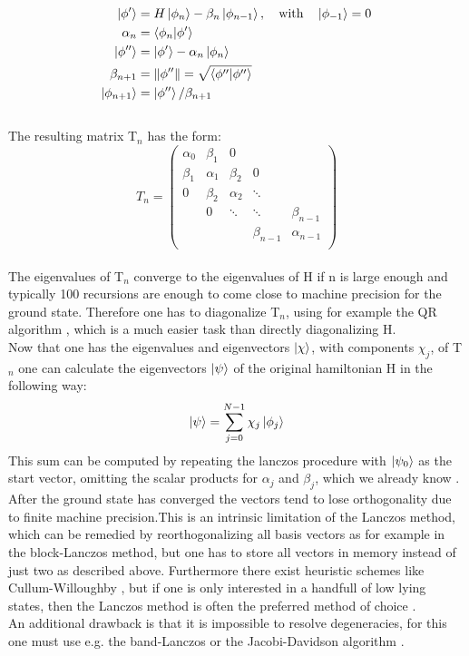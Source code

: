 \documentclass{article}
\begin{document}
\begin{align*}
\ket{\phi'}&=H\ket{\phi_n} - \beta_n\ket{\phi_{n-1}}, \quad \text{with} \quad \ket{\phi_{-1}} = 0\\
\alpha_n &= \braket{\phi_n|\phi'}\\
\ket{\phi''} &= \ket{\phi'} - \alpha_n\ket{\phi_n}\\
\beta_{n+1} &= \|\phi''\| = \sqrt{\braket{\phi''|\phi''}}\\
\ket{\phi_{n+1}} &= \ket{\phi''}/\beta_{n+1}
\end{align*}\\
The resulting matrix T$_n$ has the form:\\
\begin{equation*}
T_n = 
\begin{pmatrix}
\alpha_0 & \beta_1 & 0 & &\\
\beta_1 & \alpha_1 & \beta_2 & 0 &\\
0 & \beta_2 & \alpha_2 & \ddots & \\
 & 0 & \ddots & \ddots & \beta_{n-1}\\
 & & & \beta_{n-1} & \alpha_{n-1}\\
\end{pmatrix}
\end{equation*}\\
The eigenvalues of T$_n$ converge to the eigenvalues of H if n is
large enough and typically 100 recursions are enough to come close to
machine precision for the ground state. Therefore one has to
diagonalize T$_n$, using for example the QR algorithm \cite{Francis1,Francis2}, which is a much
easier task than directly diagonalizing H.\\
Now that one has the eigenvalues and eigenvectors $\ket{\chi}$, with
components $\chi_j$, of
T$_n$ one can calculate the eigenvectors $\ket{\psi}$ of the original
hamiltonian H in the following way:
\begin{equation}
\label{eq:15}
\ket{\psi} = \sum\limits_{j=0}^{N-1} \chi_j \ket{\phi_j}
\end{equation}
This sum can be computed by repeating the lanczos procedure with
$\ket{\psi_0}$ as the start vector, omitting the scalar products for $\alpha_j$ and
$\beta_j$, which we already know \cite{Fehske}.\\
After the ground state has converged the vectors tend to lose
orthogonality due to finite machine precision.This is an intrinsic
limitation of the Lanczos method, which can be remedied by
reorthogonalizing all basis vectors as for example in the block-Lanczos
method, but one has to store all vectors in memory instead of just two
as described above. Furthermore there exist heuristic schemes like
Cullum-Willoughby \cite{Cullum2,Cullum}, but if one is only interested in a handfull of low
lying states, then the Lanczos method is often the preferred method of
choice \cite{Noack}.\\
An additional drawback is that it is impossible to resolve
degeneracies, for this one must use e.g. the band-Lanczos or the
Jacobi-Davidson algorithm \cite{Fehske}.\\ 
\end{document}
